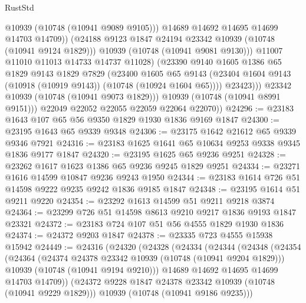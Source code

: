 \begin{lexlean}{RustStd}
\begin{coremodule}
{\begin{coremodule}
{{{{{                          @10939
                          (@10748 (@10941 @9089 @9105)))
                        @14689
                        @14692
                        @14695
                        @14699
                        @14703
                        @14709))
                    (@24188 @9123 @1847 @24194 @23342 @10939 (@10748 (@10941 @9124 @1829)))
                    @10939
                    (@10748 (@10941 @9081 @9130)))
                  @11007
                  @11010
                  @11013
                  @14733
                  @14737
                  @11028)
                (@23390
                  @9140
                  @1605
                  @1386
                  @65
                  @1829
                  @9143
                  @1829
                  @7829
                  (@23400
                    @1605
                    @65
                    @9143
                    (@23404 @1604 @9143 (@10918 (@10919 @9143)) (@10748 (@10924 @1604 @65))))
                  @23423)))
            @23342
            @10939
            (@10748 (@10941 @9073 @1829)))
          @10939
          (@10748 (@10941 @8991 @9151)))
        @22049
        @22052
        @22055
        @22059
        @22064
        @22070))
@24296 := @23183 @1643 @107 @65 @56 @9350 @1829 @1930 @1836 @9169 @1847
@24300 := @23195 @1643 @65 @9339 @9348
@24306 := @23175 @1642 @21612 @65 @9339 @9346 @7921
@24316 := @23183 @1625 @1641 @65 @10634 @9253 @9338 @9345 @1836 @9177 @1847
@24320 := @23195 @1625 @65 @9236 @9251
@24328 := @23262 @1617 @1623 @1386 @65 @9236 @9245 @1829 @9251
@24334 := @23271 @1616 @14599 @10847 @9236 @9243 @1950
@24344 := @23183 @1614 @726 @51 @14598 @9222 @9235 @9242 @1836 @9185 @1847
@24348 := @23195 @1614 @51 @9211 @9220
@24354 := @23292 @1613 @14599 @51 @9211 @9218 @3874
@24364 := @23299 @726 @51 @14598 @8613 @9210 @9217 @1836 @9193 @1847 @23321
@24372 := @23183 @724 @107 @51 @56 @4555 @1829 @1930 @1836
@24374 := @24372 @9203 @1847
@24378 := @23335 @723 @4555 @15938 @15942
@24449 := @24316
    (@24320
      (@24328
        (@24334
          (@24344
            (@24348
              (@24354
                (@24364
                  (@24374 @24378 @23342 @10939 (@10748 (@10941 @9204 @1829)))
                  @10939
                  (@10748 (@10941 @9194 @9210)))
                @14689
                @14692
                @14695
                @14699
                @14703
                @14709))
            (@24372 @9228 @1847 @24378 @23342 @10939 (@10748 (@10941 @9229 @1829)))
            @10939
            (@10748 (@10941 @9186 @9235)))
}}}}}
\end{coremodule}}
\end{coremodule}
\end{lexlean}

